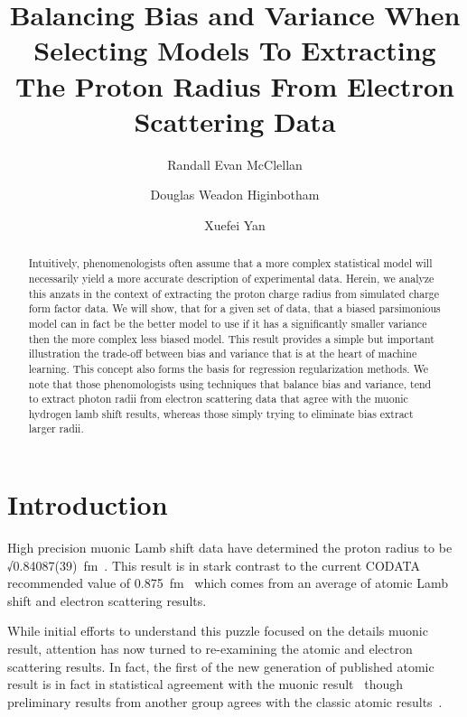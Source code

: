 \documentclass[10pt,aps,prc,twocolumn]{revtex4-1}
\begin{document}
\title{Balancing Bias and Variance When Selecting Models To Extracting The Proton Radius From Electron Scattering Data} 

\author{Randall Evan McClellan}
\author{Douglas Weadon Higinbotham}
\author{Xuefei Yan}

\begin{abstract}
Intuitively, phenomenologists often assume that a more complex statistical model will necessarily yield a more 
accurate description of experimental data.   Herein, we analyze this anzats in the context of extracting 
the proton charge radius from simulated charge form factor data.
We will show, that for a given set of data, that a biased parsimonious model can in fact be the better model to use
if it has a significantly smaller variance then the more complex less biased model.
This result provides a simple but important illustration the trade-off between bias and variance that is at the
heart of machine learning.   This concept also forms the basis for regression regularization methods.
We note that those phenomologists using techniques that balance bias and variance,
tend to extract photon radii from electron scattering data that agree with the muonic hydrogen lamb 
shift results, whereas those simply trying to eliminate bias extract larger radii.
\end{abstract}

\maketitle

\section{Introduction}

High precision muonic Lamb shift data have determined the proton radius to 
be √0.84087(39)~fm~\cite{Pohl:2010zza,Antognini:1900ns}.   This result is in stark contrast to the current
CODATA recommended value of 0.875~fm~\cite{Mohr:2015ccw} which comes from an average of atomic 
Lamb shift and electron scattering results.  

While initial efforts to understand this puzzle focused on the details muonic result, attention has
now turned to re-examining the atomic and electron scattering results.   In fact, the first of the
new generation of published atomic result is in fact in statistical agreement with the muonic 
result~\cite{Beyer79} though preliminary results from another group agrees with the classic atomic 
results~\cite{fleurbaey:tel-01633631}.
\end{document}
